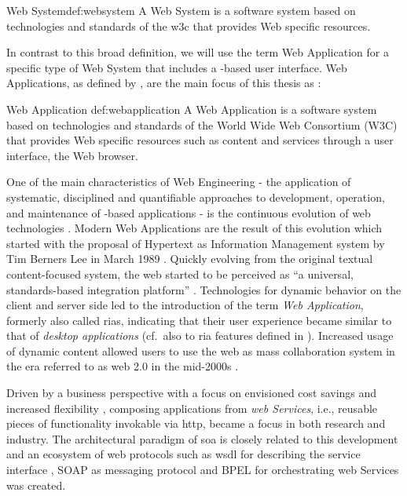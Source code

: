 \begin{thesisdefinition}{Web System}{def:websystem}
A Web System is a software system based on technologies and standards of the \gls{w3c} that provides Web specific resources.
\end{thesisdefinition}

In contrast to this broad definition, we will use the term \gls{Web Application} for a specific type of \gls{Web System} that includes a -based user interface. \glspl{Web Application}, as defined by \citeauthor{Kappel2006WebEngineering}, are the main focus of this thesis as :

\begin{thesisdefinition}{Web Application \autocite{Kappel2006WebEngineering}}{def:webapplication}
A Web Application is a software system based on technologies and standards of the World Wide Web Consortium (W3C) that provides Web specific resources such as content and services through a user interface, the Web browser.
\end{thesisdefinition}

One of the main characteristics of \gls{Web Engineering} - the application of systematic, disciplined and quantifiable approaches to development, operation, and maintenance of -based applications \autocite{Deshpande2002WebEngineering} - is the continuous evolution of \Gls{web} technologies \autocite{Gitzel2007WebEngineeringMDD}.
Modern \glspl{Web Application} are the result of this evolution \autocite{Kienle2014EvolutionWeb} which started with the proposal of Hypertext as Information Management system by Tim Berners Lee in March 1989 \autocite{Berners-Lee1989}.
Quickly evolving from the original textual content-focused system, the \Gls{web} started to be perceived as ``a universal, standards-based integration platform'' \autocite{Knorr2003WebAsPlatform}.
Technologies for dynamic behavior on the client and server side led to the introduction of the term \emph{\gls{Web Application}}, formerly also called \glspl{ria}, indicating that their user experience became similar to that of \emph{desktop applications} \autocite{Kienle2014EvolutionWeb} (cf.~also to \gls{ria} features defined in \autocite{Rodriguez-Echeverria2012MIGRARIA}).
Increased usage of dynamic content allowed users to use the \Gls{web} as mass collaboration system in the era referred to as \Gls{web} 2.0 in the mid-2000s \autocite{OReilly2007Web2.0}.

Driven by a business perspective with a focus on envisioned cost savings and increased flexibility \autocite{Kienle2014EvolutionWeb}, composing applications from \emph{\Gls{web} Services}, i.e., reusable pieces of functionality invokable via \gls{http}, became a focus in both research and industry.
The architectural paradigm of \gls{soa} \autocite{Oasis2006SOA} is closely related to this development and an ecosystem of \Gls{web} protocols such as \gls{wsdl} for describing the service interface \autocite{W3C2007WSDL2.0}, SOAP as messaging protocol \autocite{W3C2003SOAP} and BPEL for orchestrating \Gls{web} Services \autocite{OASIS2007BPEL} was created.

